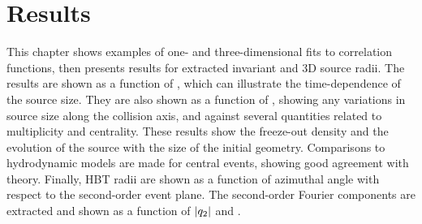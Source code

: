 \chapter{Results}
\label{ch:results}
\graphicspath{{Chapter-Results/figures/}}

This chapter shows examples of one- and three-dimensional fits to correlation functions, then presents results for extracted invariant and 3D source radii.
The results are shown as a function of \kt, which can illustrate the time-dependence of the source size.
They are also shown as a function of \kys, showing any variations in source size along the collision axis, and against several quantities related to multiplicity and centrality.
These results show the freeze-out density and the evolution of the source with the size of the initial geometry.
Comparisons to hydrodynamic models are made for central events, showing good agreement with theory.
Finally, \ac{HBT} radii are shown as a function of azimuthal angle with respect to the second-order event plane.
The second-order Fourier components are extracted and shown as a function of $|q_{2}|$ and \kt.

